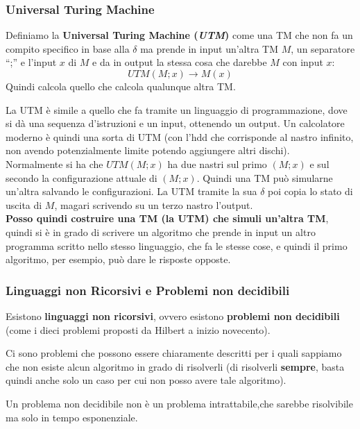 \subsubsection{Universal Turing Machine}
\begin{definizione}
  Definiamo la \textbf{Universal Turing Machine (\textit{UTM})} come una TM che
  non fa un compito specifico in base alla $\delta$ ma prende in input un'altra
  TM $M$, un separatore ``;'' e l'input $x$ di $M$ e da in output la stessa cosa
  che darebbe $M$ con input $x$:
  \[UTM(M;x)\to M(x)\]
  Quindi calcola quello che calcola qualunque altra TM.
\end{definizione}
La UTM è simile a quello che fa tramite un linguaggio di programmazione, dove si dà una sequenza d'istruzioni e un input, ottenendo un output. Un calcolatore moderno è quindi una sorta di UTM (con l'hdd che corrisponde al nastro infinito, non avendo potenzialmente limite potendo aggiungere altri dischi).\\ Normalmente si ha che $UTM(M;x)$ ha due nastri sul primo $(M;x)$ e sul secondo la configurazione attuale di $(M;x)$. Quindi una TM può simularne un'altra salvando le configurazioni. La UTM tramite la sua $\delta$ poi copia lo stato di uscita di $M$, magari scrivendo su un terzo nastro l'output.\\ \textbf{Posso quindi costruire una TM (la UTM) che simuli un'altra TM}, quindi si è in grado di scrivere un algoritmo che prende in input un altro programma scritto nello stesso linguaggio, che fa le stesse cose, e quindi il primo algoritmo, per esempio, può dare le risposte opposte.\\
\subsubsection{Linguaggi non Ricorsivi e Problemi non decidibili}
\begin{definizione}
  Esistono \textbf{linguaggi non ricorsivi}, ovvero esistono \textbf{problemi non decidibili} (come i dieci problemi proposti da Hilbert a inizio novecento).
\end{definizione}
Ci sono problemi che possono essere chiaramente descritti per i quali sappiamo
che non esiste alcun algoritmo in grado di risolverli (di risolverli
\textbf{sempre}, basta quindi anche solo un caso per cui non posso avere tale algoritmo). 
\begin{definizione}
  Un problema non decidibile non è un problema intrattabile,che sarebbe risolvibile ma solo in tempo esponenziale.
\end{definizione}
